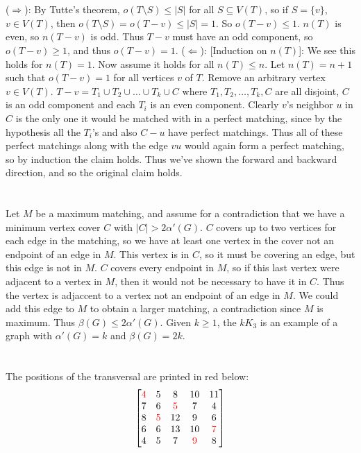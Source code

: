 \documentclass[11pt]{article}
\begin{document}
\section{} %
($\Longrightarrow$): By Tutte's theorem, $o(T\setminus S)\le|S|$ for all
$S\subseteq V(T)$, so if $S=\{v\}$, $v\in V(T)$, then
$o(T\setminus S)=o(T-v)\le|S|=1$. So $o(T-v)\le1$. $n(T)$ is even, so $n(T-v)$
is odd. Thus $T-v$ must have an odd component, so $o(T-v)\ge1$, and thus
$o(T-v)=1$.
\newline
\newline
($\Longleftarrow$): [Induction on $n(T)$]: We see this holds for $n(T)=1$. Now
assume it holds for all $n(T)\le n$. Let $n(T)=n+1$ such that $o(T-v)=1$ for
all vertices $v$ of $T$. Remove an arbitrary vertex $v\in V(T)$.
$T-v=T_1\cup T_2\cup\ldots\cup T_k\cup C$ where $T_1,T_2,\ldots,T_k,C$ are all
disjoint, $C$ is an odd component and each $T_i$ is an even component. Clearly
$v$'s neighbor $u$ in $C$ is the only one it would be matched with in a perfect
matching, since by the hypothesis all the $T_i$'s and also $C-u$ have perfect
matchings. Thus all of these perfect matchings along with the edge $vu$ would
again form a perfect matching, so by induction the claim holds.
\newline
\newline
Thus we've shown the forward and backward direction, and so the original claim
holds.


\section{} %
Let $M$ be a maximum matching, and assume for a contradiction that we have a
minimum vertex cover $C$ with $|C|>2\alpha'(G)$. $C$ covers up to two vertices
for each edge in the matching, so we have at least one vertex in the cover not
an endpoint of an edge in $M$. This vertex is in $C$, so it must be covering an
edge, but this edge is not in $M$. $C$ covers every endpoint in $M$, so if this
last vertex were adjacent to a vertex in $M$, then it would not be necessary to
have it in $C$. Thus the vertex is adjaccent to a vertex not an endpoint of an
edge in $M$. We could add this edge to $M$ to obtain a larger matching, a
contradiction since $M$ is maximum. Thus $\beta(G)\le2\alpha'(G)$.
\newline
\newline
Given $k\ge1$, the $kK_3$ is an example of a graph with $\alpha'(G)=k$ and
$\beta(G)=2k$.


\section{} %
The positions of the transversal are printed in red below:
\[
\begin{bmatrix}
	\color{red}4& 5 & 8 & 10 & 11\\
	7 & 6 & \color{red}5 & 7 & 4\\
	8 & \color{red}5 & 12 & 9 & 6\\
	6 & 6 & 13 & 10 & \color{red}7\\
	4 & 5 & 7 & \color{red}9 & 8
\end{bmatrix}
\]
\end{document}

